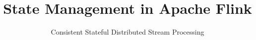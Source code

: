 \documentclass{vldb}
\begin{document}

\title{State Management in Apache Flink\textsuperscript{\textregistered}}


\subtitle{Consistent Stateful Distributed Stream Processing}


%
%
%
%


\end{document}
